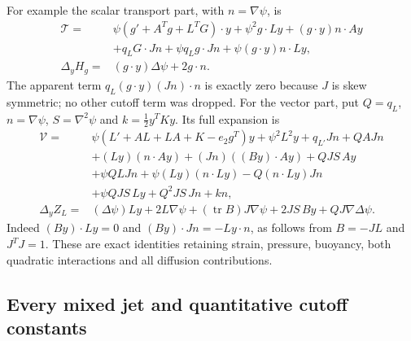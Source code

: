 For example the scalar transport part, with $n=\nabla\psi$, is
\begin{align}
 \mathcal T
 ={}&\psi(g'+A^Tg+L^TG)\cdot y
       +\psi^2 g\cdot Ly+(g\cdot y)n\cdot Ay\nonumber\\
    &+q_L G\cdot Jn+\psi q_Lg\cdot Jn
       +\psi(g\cdot y)n\cdot Ly, \label{cvlane:ifs:expanded-scalar}\\
 \Delta_yH_g
 ={}&(g\cdot y)\Delta\psi+2g\cdot n. \nonumber
\end{align}
The apparent term $q_L(g\cdot y)(Jn)\cdot n$ is exactly zero
because $J$ is skew symmetric; no other cutoff term was dropped.
For the vector part, put $Q=q_L$, $n=\nabla\psi$,
$S=\nabla^2\psi$ and $k=\tfrac12y^TKy$.  Its full expansion is
\begin{align}
 \mathcal V={}&\psi(L'+AL+LA+K-e_2g^T)y+\psi^2L^2y
       +q_{L'}Jn+QAJn\nonumber\\
 &+(Ly)(n\cdot Ay)+(Jn)((By)\cdot Ay)+QJS\,Ay\nonumber\\
 &+\psi QLJn+\psi(Ly)(n\cdot Ly)
       -Q(n\cdot Ly)Jn\nonumber\\
 &+\psi QJS\,Ly+Q^2JS\,Jn+kn,\label{cvlane:ifs:expanded-vector}\\
 \Delta_y Z_L={}&(\Delta\psi)Ly+2L\nabla\psi
       +(\operatorname{tr}B)J\nabla\psi
       +2JS\,By+QJ\nabla\Delta\psi. \nonumber
\end{align}
Indeed $(By)\cdot Ly=0$ and $(By)\cdot Jn=-Ly\cdot n$,
as follows from $B=-JL$ and $J^TJ=1$.
These are exact identities retaining strain, pressure, buoyancy,
both quadratic interactions and all diffusion contributions.

\subsection{Every mixed jet and quantitative cutoff constants}

